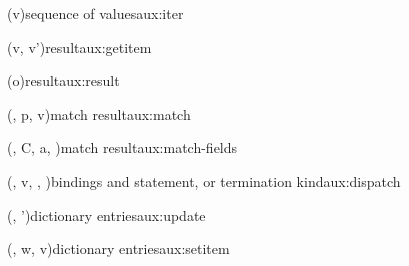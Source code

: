 \begin{auxfunction}{\iterOp(v)}{sequence of values}{aux:iter}

\end{auxfunction}

\begin{auxfunction}{\getitem(v, v')}{result}{aux:getitem}

\end{auxfunction}

\begin{auxfunction}{\result(o)}{result}{aux:result}

\end{auxfunction}

\begin{auxfunction}{\matchOp{\Sigma}(\rho, p, v)}{match result}{aux:match}

\end{auxfunction}

\begin{auxfunction}{\matchFields{\Sigma}(\rho, C, a, )}{match result}{aux:match-fields}

\end{auxfunction}

\begin{auxfunction}{\dispatch(\rho, v, , )}{bindings and statement, or termination kind}{aux:dispatch}

\end{auxfunction}

\begin{auxfunction}{\update(\delta, \delta')}{dictionary entries}{aux:update}

\end{auxfunction}

\begin{auxfunction}{\setitem(\delta, w, v)}{dictionary entries}{aux:setitem}

\end{auxfunction}
